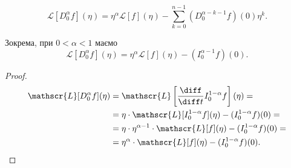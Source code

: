 \begin{lemma}
    \begin{equation}
        \mathscr{L}[D_0^\alpha f](\eta) = \eta^{\alpha} \mathscr{L}[f](\eta) - \sum_{k = 0}^{n - 1} (D_0^{\alpha - k - 1} f) (0) \eta^k.
    \end{equation}
\end{lemma}
\begin{example}
    Зокрема, при $0 < \alpha < 1$ маємо
    \begin{equation}
        \mathscr{L}[D_0^\alpha f](\eta) = \eta^{\alpha} \mathscr{L}[f](\eta) - (I_0^{\alpha - 1} f) (0).
    \end{equation}
\end{example}
\begin{proof}
    \begin{equation}
        \begin{aligned}
            \mathscr{L}[D_0^\alpha f](\eta) &= \mathscr{L} \left[\frac{\diff}{\diff t} I_0^{1 - \alpha} f \right](\eta) = \\
            &= \eta \cdot \mathscr{L} [I_0^{1 - \alpha} f](\eta) - (I_0^{1 - \alpha} f)(0) = \\
            &= \eta \cdot \eta^{\alpha - 1} \cdot \mathscr{L} [f](\eta) - (I_0^{1 - \alpha} f)(0) = \\
            &= \eta^\alpha \cdot \mathscr{L} [f](\eta) - (I_0^{1 - \alpha} f)(0).
        \end{aligned}
    \end{equation}
\end{proof}

